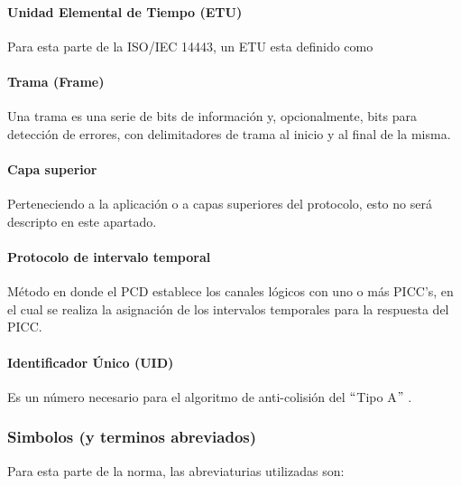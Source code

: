 \vspace{\baselineskip}
\paragraph{Unidad Elemental de Tiempo (ETU)}
Para esta parte de la ISO/IEC 14443, un ETU esta definido como\par

\paragraph{Trama (Frame)}
Una trama es una serie de bits de información y, opcionalmente, bits para detección de errores, con delimitadores de trama al inicio y al final de la misma.\par

\paragraph{Capa superior}
Perteneciendo a la aplicación o a capas superiores del protocolo, esto no será descripto en este apartado.\par

\paragraph{Protocolo de intervalo temporal}
Método en donde el PCD establece los canales lógicos con uno o más PICC’s, en el cual se realiza la asignación de los intervalos temporales para la respuesta del PICC.\par

\paragraph{Identificador Único (UID)}
Es un número necesario para el algoritmo de anti-colisión del $``$Tipo A$"$ .\par

\subsubsection{Simbolos (y terminos abreviados)}
Para esta parte de la norma, las abreviaturias utilizadas son:\par

